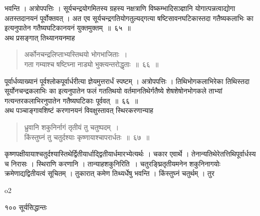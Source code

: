 \documentclass[11pt, openany]{book}
\begin{document}
\begin{sloppypar}
\noindent भवन्ति । अत्रोपपत्तिः । सूर्यचन्द्रयोगमितस्य ग्रहस्य नक्षत्राणि विष्कम्भादिसञ्ज्ञानि योगात्पन्नत्वाद्योगा अतस्तदानयनं पूर्वोक्तवत् । अत एव सूर्यचन्द्रगतियोगतुल्यद्गत्या षष्टिसावनघटिकास्तदा गतैष्यकलाभिः का इत्यनुपातेन गतैष्यघटिकानयनं युक्तमुक्तम्~॥~६५~॥\\
\noindent अथ प्रसङ्गात् तिथ्यानयनमाह\textendash
\end{sloppypar}
\begin{quote}

 {\ssi अर्कोनचन्द्रलिप्ताभ्यस्तिथयो भोगभाजिताः~।\\
गता गम्याश्च षष्टिघ्ना नाड्यो भुक्त्यन्तरोद्धृताः~॥~६६~॥}
\end{quote}
\begin{sloppypar}

 पूर्वार्धव्याख्यानं पूर्वश्लोकपूर्वार्धरीत्या ज्ञेयमुत्तरार्धं स्पष्टम् । अत्रोपपत्तिः । तिथिभोगकलाभिरेका तिथिस्तदा सूर्योनचन्द्रकलाभिः का इत्यनुपातेन फलं गततिथयो वर्तमानतिथेर्गतैष्ये शेषशेषोनभोगकले ताभ्यां गत्यन्तरकलाभिरनुपातेन गतैष्यघटिकाः पूर्ववत्~॥~६६~॥\\
\noindent  अथ पञ्चाङ्गावशिष्टं करणानयनं विवक्षुस्तावत् स्थिरकरणान्याह\textendash
\end{sloppypar}
\begin{quote}

 {\ssi ध्रुवानि शकुनिर्नागं तृतीयं तु चतुष्पदम्~।\\
किंस्तुघ्नं तु चतुर्दश्याः कृष्णायाश्चापरार्धतः~॥~६७~॥}
\end{quote}

\begin{sloppypar}
 कृष्णपक्षीयायाश्चतुर्दश्यास्तिथेर्द्वितीयार्धाद्द्वितीयार्धमारभ्येत्यर्थः । चकार एवार्थे । तेनान्यतिथेरेतत्तिथिपूर्वार्धस्य च निरासः । स्थिराणि करणानि । तान्याह\textendash शकुनिरिति~। चतुरङ्घ्रितृतीयमनेन शकुनिनागयोः क्रमेणाद्यद्वितीयत्वं सूचितम् ।
तुकारात् कमेण तिथ्यर्धेषु भवन्ति । किंस्तुघ्नं चतुर्थम् । तुर\textendash
\end{sloppypar}

{\tiny{o2}}

\newpage



\noindent १०० \hspace{3cm} सूर्यसिद्धान्तः
\vspace{1cm}
\end{document}
